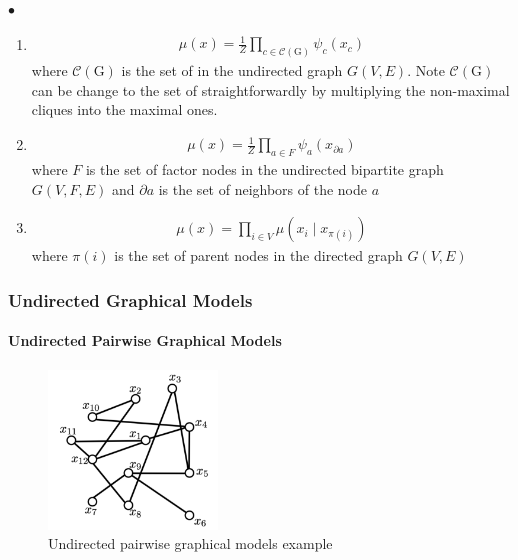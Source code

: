 \documentclass{article}
\begin{document}
$\bullet$ 
\begin{enumerate}
    \item {}
    \begin{align}
\mu(x)=\frac{1}{Z} \prod_{c \in \mathcal{C}(\mathrm{G})} \psi_{c}\left(x_{c}\right)\label{eq:max_undir_graph}
\end{align}
where $\mathcal{C}(\mathrm{G})$ is the set of  in the undirected graph $G(V, E)$. Note $\mathcal{C}(\mathrm{G})$ can be change to the set of  straightforwardly by multiplying the non-maximal cliques into the maximal ones.
\item {}
\begin{align*}
\mu(x)=\frac{1}{Z} \prod_{a \in F} \psi_{a}\left(x_{\partial a}\right)
\end{align*}
where $F$ is the set of factor nodes in the undirected bipartite graph $G(V, F, E)$ and $\partial a$ is the set of neighbors of the node $a$
\item {}
 \begin{align*}
\mu(x)=\prod_{i \in V} \mu\left(x_{i} \mid x_{\pi(i)}\right)
\end{align*}
where $\pi(i)$ is the set of parent nodes in the directed graph $G(V, E)$
\end{enumerate}

\subsubsection{Undirected Graphical Models}
\paragraph{Undirected Pairwise Graphical Models}
\begin{figure}[H]
    \centering
    \includegraphics[width=0.4\textwidth]{Figs/1.png}
    \caption{Undirected pairwise graphical models example}
    \label{fig:Pairwise_Graph}
\end{figure}
\end{document}
